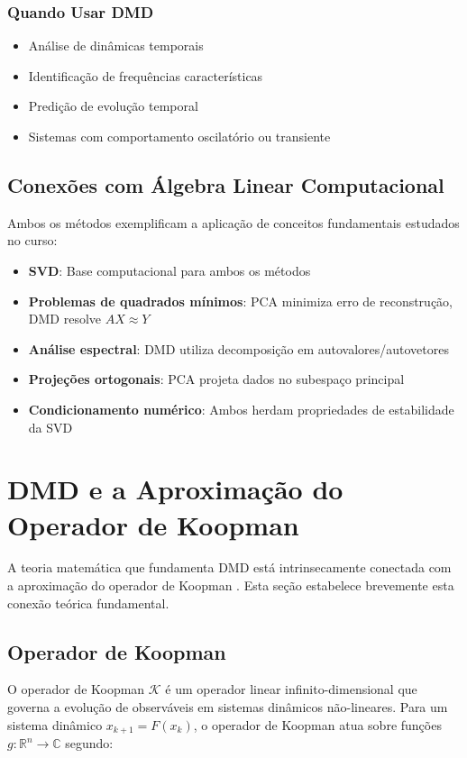 \documentclass[a4,11pt]{pssbmac}
\begin{document}
\subsubsection{Quando Usar DMD}
\begin{itemize}
\item Análise de dinâmicas temporais
\item Identificação de frequências características
\item Predição de evolução temporal
\item Sistemas com comportamento oscilatório ou transiente
\end{itemize}

\subsection{Conexões com Álgebra Linear Computacional}

Ambos os métodos exemplificam a aplicação de conceitos fundamentais estudados no curso:

\begin{itemize}
\item \textbf{SVD}: Base computacional para ambos os métodos
\item \textbf{Problemas de quadrados mínimos}: PCA minimiza erro de reconstrução, DMD resolve $AX \approx Y$
\item \textbf{Análise espectral}: DMD utiliza decomposição em autovalores/autovetores
\item \textbf{Projeções ortogonais}: PCA projeta dados no subespaço principal
\item \textbf{Condicionamento numérico}: Ambos herdam propriedades de estabilidade da SVD
\end{itemize}

\section{DMD e a Aproximação do Operador de Koopman}

A teoria matemática que fundamenta DMD está intrinsecamente conectada com a aproximação do operador de Koopman \cite{Williams2015}. Esta seção estabelece brevemente esta conexão teórica fundamental.

\subsection{Operador de Koopman}

O operador de Koopman $\mathcal{K}$ é um operador linear infinito-dimensional que governa a evolução de observáveis em sistemas dinâmicos não-lineares. Para um sistema dinâmico $x_{k+1} = F(x_k)$, o operador de Koopman atua sobre funções $g: \mathbb{R}^n \rightarrow \mathbb{C}$ segundo:
\end{document}
